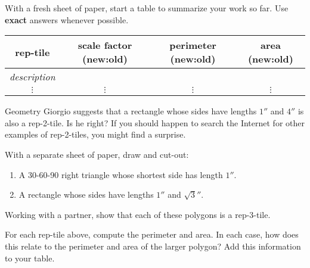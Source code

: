 \begin{prob}
With a fresh sheet of paper, start a table to summarize your work so far.  Use \textbf{exact} answers whenever possible.
\begin{center}
\begin{tabular}{c|c|c|c}
rep-tile & scale factor (new:old) &  perimeter (new:old) &  area (new:old)  \\ \hline\hline
\textit{description} &     &      &     \\ 
  $\vdots$    & $\vdots$  &  $\vdots$  &  $\vdots$ \\ 
\end{tabular}
\end{center}
\end{prob}


\begin{prob}
Geometry Giorgio suggests that a rectangle whose sides have lengths
$1''$ and $4''$ is also a rep-2-tile. Is he right? If you should
happen to search the Internet for other examples of rep-2-tiles, you
might find a surprise.
\end{prob}


\begin{prob}
With a separate sheet of paper, draw and cut-out:
\begin{enumerate}
\item A 30-60-90 right triangle whose shortest side has length $1''$.
\item A rectangle whose sides have lengths $1''$ and $\sqrt{3}''$.
\end{enumerate}
Working with a partner, show that each of these polygons is a rep-3-tile.
\end{prob}

\begin{prob}
For each rep-tile above, compute the perimeter and area. In each case,
how does this relate to the perimeter and area of the larger polygon?
Add this information to your table.
\end{prob}

